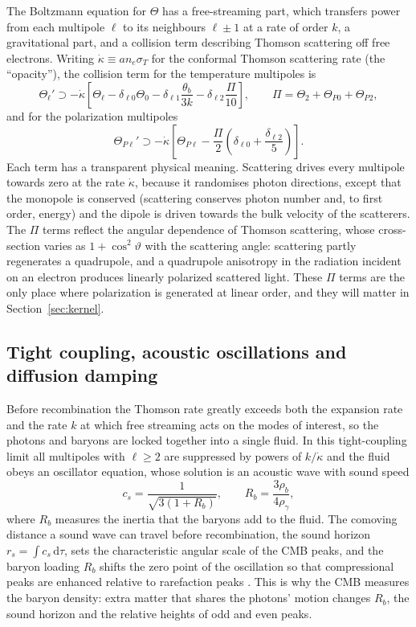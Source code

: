 \documentclass[11pt,a4paper]{article}
\newcommand{\dd}{\mathrm{d}}
\begin{document}
The Boltzmann equation for $\Theta$ has a free-streaming part, which transfers power from each multipole $\ell$ to its neighbours $\ell\pm1$ at a rate of order $k$, a gravitational part, and a collision term describing Thomson scattering off free electrons. Writing $\dot\kappa \equiv a n_e \sigma_T$ for the conformal Thomson scattering rate (the ``opacity''), the collision term for the temperature multipoles is \citep{DodelsonSchmidt2020}
\begin{equation}
\Theta_\ell' \supset -\dot\kappa\left[\Theta_\ell - \delta_{\ell0}\Theta_0 - \delta_{\ell1}\frac{\theta_b}{3k} - \delta_{\ell2}\frac{\Pi}{10}\right],
\qquad \Pi = \Theta_2 + \Theta_{P0} + \Theta_{P2},
\label{eq:collision}
\end{equation}
and for the polarization multipoles
\begin{equation}
\Theta_{P\ell}' \supset -\dot\kappa\left[\Theta_{P\ell} - \frac{\Pi}{2}\left(\delta_{\ell0} + \frac{\delta_{\ell2}}{5}\right)\right].
\label{eq:collisionP}
\end{equation}
Each term has a transparent physical meaning. Scattering drives every multipole towards zero at the rate $\dot\kappa$, because it randomises photon directions, except that the monopole is conserved (scattering conserves photon number and, to first order, energy) and the dipole is driven towards the bulk velocity of the scatterers. The $\Pi$ terms reflect the angular dependence of Thomson scattering, whose cross-section varies as $1+\cos^2\vartheta$ with the scattering angle: scattering partly regenerates a quadrupole, and a quadrupole anisotropy in the radiation incident on an electron produces linearly polarized scattered light. These $\Pi$ terms are the only place where polarization is generated at linear order, and they will matter in Section~\ref{sec:kernel}.

\subsection{Tight coupling, acoustic oscillations and diffusion damping}

Before recombination the Thomson rate greatly exceeds both the expansion rate and the rate $k$ at which free streaming acts on the modes of interest, so the photons and baryons are locked together into a single fluid. In this tight-coupling limit all multipoles with $\ell\ge2$ are suppressed by powers of $k/\dot\kappa$ and the fluid obeys an oscillator equation, whose solution is an acoustic wave with sound speed
\begin{equation}
c_s = \frac{1}{\sqrt{3(1+R_b)}}, \qquad R_b = \frac{3\rho_b}{4\rho_\gamma},
\end{equation}
where $R_b$ measures the inertia that the baryons add to the fluid. The comoving distance a sound wave can travel before recombination, the sound horizon $r_s = \int c_s\,\dd\tau$, sets the characteristic angular scale of the CMB peaks, and the baryon loading $R_b$ shifts the zero point of the oscillation so that compressional peaks are enhanced relative to rarefaction peaks \citep{HuSugiyama1995}. This is why the CMB measures the baryon density: extra matter that shares the photons' motion changes $R_b$, the sound horizon and the relative heights of odd and even peaks.
\end{document}
